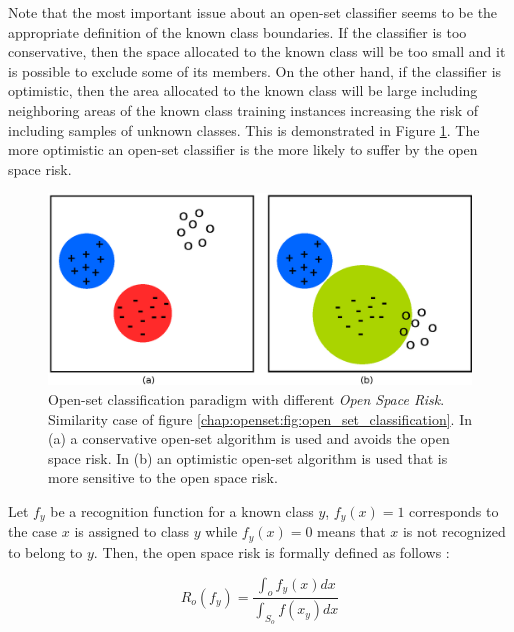 Note that the most important issue about an open-set classifier seems to be the appropriate definition of the known class boundaries. If the classifier is too conservative, then the space allocated to the known class will be too small and it is possible to exclude some of its members. On the other hand, if the classifier is optimistic, then the area allocated to the known class will be large including neighboring areas of the known class training instances increasing the risk of including samples of unknown classes. This is demonstrated in Figure \ref{chap:openset:fig:open_space_risk_schema}. The more optimistic an open-set classifier is the more likely to suffer by the open space risk.

\begin{figure}[t]
	\begin{center}
    	\includegraphics[scale=0.70]{Figures/open_space_risk_schema.eps}
		\caption{Open-set classification paradigm with different \textit{Open Space Risk}. Similarity case of figure \ref{chap:openset:fig:open_set_classification}. In (a) a conservative open-set algorithm is used and avoids the open space risk. In (b) an optimistic open-set algorithm is used that is more sensitive to the open space risk.}
		\label{chap:openset:fig:open_space_risk_schema}
	\end{center}
\end{figure}


Let $f_y$ be a recognition function for a known class $y$, $f_y(x)=1$ corresponds to the case $x$ is assigned to class $y$ while $f_y(x)=0$ means that $x$ is not recognized to belong to $y$. Then, the open space risk is formally defined as follows \parencite{scheirer2013toward}:

\begin{equation}\label{chap:eval_methods:eq:the_original_open_space_risk}
	R_{o}(f_y) = \frac{\int_{o} f_y(x) dx}{\int_{S_{o}}  f(x_y) dx}
\end{equation}

